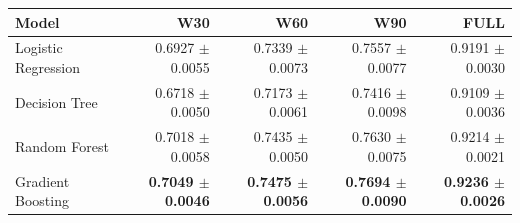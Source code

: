 \small
\setlength{\tabcolsep}{4pt}
\begin{tabular}{@{}lrrrr@{}}
\toprule
Model & W30 & W60 & W90 & FULL \\
\midrule
Logistic Regression & 0.6927 $\pm$ 0.0055 & 0.7339 $\pm$ 0.0073 & 0.7557 $\pm$ 0.0077 & 0.9191 $\pm$ 0.0030 \\
Decision Tree & 0.6718 $\pm$ 0.0050 & 0.7173 $\pm$ 0.0061 & 0.7416 $\pm$ 0.0098 & 0.9109 $\pm$ 0.0036 \\
Random Forest & 0.7018 $\pm$ 0.0058 & 0.7435 $\pm$ 0.0050 & 0.7630 $\pm$ 0.0075 & 0.9214 $\pm$ 0.0021 \\
Gradient Boosting & \textbf{0.7049 $\pm$ 0.0046} & \textbf{0.7475 $\pm$ 0.0056} & \textbf{0.7694 $\pm$ 0.0090} & \textbf{0.9236 $\pm$ 0.0026} \\
\bottomrule
\end{tabular}
